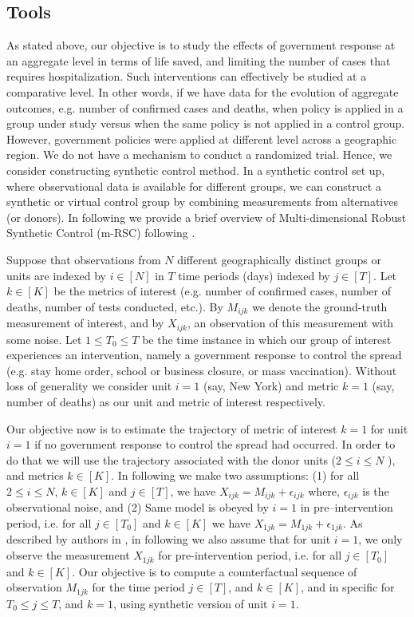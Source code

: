 \documentclass[preprint,authoryear,12pt]{elsarticle}
\begin{document}
	\subsection{Tools}
	As stated above, our objective is to study the effects of government response at an aggregate level in terms of life saved, and limiting the number of cases that requires hospitalization. Such interventions can effectively be studied at a comparative level. In other words, if we have data for the evolution of aggregate outcomes, e.g. number of confirmed cases and deaths, when policy is applied in a group under study versus when the same policy is not applied in a control group. However, government policies were applied at different level across a geographic region.  We do not have a mechanism to conduct a randomized trial. Hence, we consider constructing synthetic control method\cite{ap08746, JMLR18, AMSS19}. In a synthetic control set up, where observational data is available for different groups, we can construct a synthetic or virtual control group by combining measurements from alternatives (or donors). In following we provide a brief overview of Multi-dimensional Robust Synthetic Control (m-RSC) following \cite{AMSS19}.\par
	
	Suppose that observations from $N$ different geographically distinct groups or units are indexed by $i \in [N]$ in $T$ time periods (days) indexed by $j \in [T]$. Let $k \in [K]$ be the metrics of interest (e.g. number of confirmed cases, number of deaths, number of tests conducted, etc.). By $M_{ijk}$ we denote the ground-truth measurement of interest, and by $X_{ijk}$, an observation of this measurement with some noise. Let $1 \leq T_0 \leq T$ be the time instance in which our group of interest experiences an intervention, namely a government response to control the spread (e.g. stay home order, school or business closure, or mass vaccination). Without loss of generality we consider unit $i = 1$ (say, New York) and metric $k = 1$ (say, number of deaths) as our unit and metric of interest respectively.\par
	
	Our objective now is to estimate the trajectory of metric of interest $k = 1$  for unit $i = 1$ if no government response to control the spread had occurred. In order to do that we will use the trajectory associated with the donor units ($2 \leq i \leq N$ ), and metrics $k \in [K ]$. In following we make two assumptions: (1) for all $2 \leq i \leq N$, $k \in [K]$ and $j \in [T]$, we have  $X_{ijk} = M_{ijk} + \epsilon_{ijk}$ where, $\epsilon_{ijk}$ is the observational noise, and (2) Same model is obeyed by $i=1$ in pre--intervention period, i.e. for all $j \in [T_0]$ and $k \in [K]$ we have $X_{1jk} = M_{1jk} + \epsilon_{1jk}$. As described by authors in \cite{AMSS19}, in following we also assume that for unit $i=1$, we only observe the measurement $X_{1jk}$ for pre-intervention period, i.e. for all $j \in [T_0]$ and $k \in [K]$. Our objective is to compute a counterfactual sequence of observation $M_{1jk}$ for the time period $j \in [T]$, and $k \in [K]$, and in specific for $T_0 \leq j \leq T$, and $k = 1$, using synthetic version of unit $i=1$.\par
	
\end{document}

